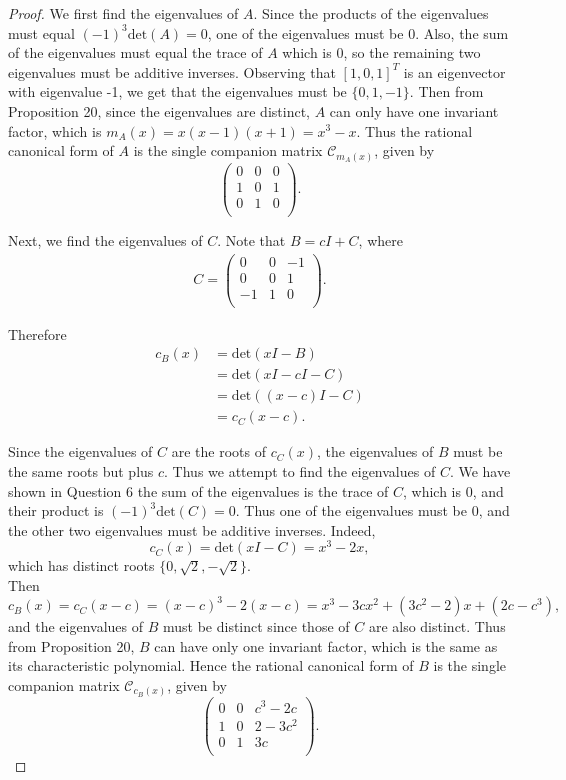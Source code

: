 \documentclass{article}
\begin{document}
  \begin{proof}
    We first find the eigenvalues of $A$. Since the products of the
    eigenvalues must equal $(-1)^3\text{det}(A)=0$, one of the eigenvalues
    must be 0. Also, the sum of the eigenvalues must equal the trace of $A$
    which is 0, so the remaining two eigenvalues must be additive inverses.
    Observing that $[1,0,1]^T$ is an eigenvector with eigenvalue -1, we get
    that the eigenvalues must be $\{0,1,-1\}$. Then from Proposition 20,
    since the eigenvalues are distinct, $A$ can only have one invariant
    factor, which is $m_A(x)=x(x-1)(x+1)=x^3-x$. Thus the rational
    canonical form of $A$ is the single companion matrix
    $\mathcal{C}_{m_A(x)}$, given by
    \[\begin{pmatrix}
      0&0&0\\
      1&0&1\\
      0&1&0\\
    \end{pmatrix}.\]

    Next, we find the eigenvalues of $C$. Note that $B=cI+C$, where
    \begin{align*}
      C=\begin{pmatrix}
        0&0&-1\\
        0&0&1\\
        -1&1&0\\
      \end{pmatrix}.
    \end{align*}

    Therefore
    \begin{align*}
      c_B(x) &=\text{det}(xI-B)\\
      &=\text{det}(xI-cI-C)\\
      &=\text{det}((x-c)I-C)\\
      &=c_C(x-c).
    \end{align*}

    Since the eigenvalues of $C$ are the roots of $c_C(x)$, the eigenvalues
    of $B$ must be the same roots but plus $c$. Thus we attempt to find the
    eigenvalues of $C$. We have shown in Question 6 the sum of the
    eigenvalues is the trace of $C$, which is 0, and their product is
    $(-1)^3\text{det}(C)=0$. Thus one of the eigenvalues must be 0, and the
    other two eigenvalues must be additive inverses. Indeed,
    \[c_C(x)=\text{det}(xI-C)=x^3-2x,\]
    which has distinct roots $\{0,\sqrt{2},-\sqrt{2}\}$. \\

    Then
    \[c_B(x)=c_C(x-c)=(x-c)^3-2(x-c) =x^3-3cx^2+(3c^2-2)x+(2c-c^3),\]
    and the eigenvalues of $B$ must be distinct since those of $C$ are also
    distinct. Thus from Proposition 20, $B$ can have only one invariant
    factor, which is the same as its characteristic polynomial. Hence the
    rational canonical form of $B$ is the single companion matrix
    $\mathcal{C}_{c_B(x)}$, given by
    \[\begin{pmatrix}
      0&0&c^3-2c\\
      1&0&2-3c^2\\
      0&1&3c\\
    \end{pmatrix}.\]
  \end{proof}
\end{document}
